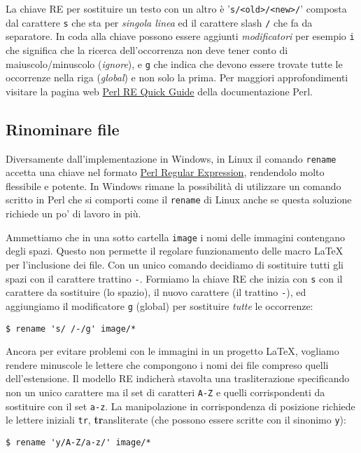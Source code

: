 La chiave RE per sostituire un testo con un altro è '\verb=s/<old>/<new>/='
composta dal carattere \texttt{s} che sta per \emph{singola linea} ed il
carattere slash \texttt{/} che fa da separatore. In coda alla chiave possono
essere aggiunti \emph{modificatori} per esempio \texttt{i} che significa che la
ricerca dell'occorrenza non deve tener conto di maiuscolo/minuscolo
(\emph{ignore}), e \texttt{g} che indica che devono essere trovate tutte le
occorrenze nella riga (\emph{global}) e non solo la prima. Per maggiori
approfondimenti visitare la pagina web
\href{http://perldoc.perl.org/perlrequick.html}{Perl RE Quick Guide} della
documentazione Perl.


\subsection{Rinominare file}

Diversamente dall'implementazione in Windows, in Linux il comando
\texttt{rename} accetta una chiave nel formato
\href{http://perldoc.perl.org/perlrequick.html}{Perl Regular Expression},
rendendolo molto flessibile e potente. In Windows rimane la possibilità di
utilizzare un comando scritto in Perl che si comporti come il \texttt{rename} di
Linux anche se questa soluzione richiede un po' di lavoro in più.

Ammettiamo che in una sotto cartella \texttt{image} i nomi delle immagini
contengano degli spazi. Questo non permette il regolare funzionamento delle
macro \LaTeX{} per l'inclusione dei file. Con un unico comando decidiamo di
sostituire tutti gli spazi con il carattere trattino \texttt{-}. Formiamo la
chiave RE che inizia con \texttt{s} con il carattere da sostituire (lo spazio),
il nuovo carattere (il trattino \texttt{-}), ed aggiungiamo il modificatore
\texttt{g} (global) per sostituire \emph{tutte} le occorrenze:
\begin{verbatim}
$ rename 's/ /-/g' image/*
\end{verbatim}

Ancora per evitare problemi con le immagini in un progetto \LaTeX, vogliamo
rendere minuscole le lettere che compongono i nomi dei file compreso quelli
dell'estensione. Il modello RE indicherà stavolta una trasliterazione
specificando non un unico carattere ma il set di caratteri \texttt{A-Z} e quelli
corrispondenti da sostituire con il set \texttt{a-z}. La manipolazione in
corrispondenza di posizione richiede le lettere iniziali \texttt{tr},
\textbf{tr}ansliterate (che possono essere scritte con il sinonimo \texttt{y}):
\begin{verbatim}
$ rename 'y/A-Z/a-z/' image/*
\end{verbatim}

